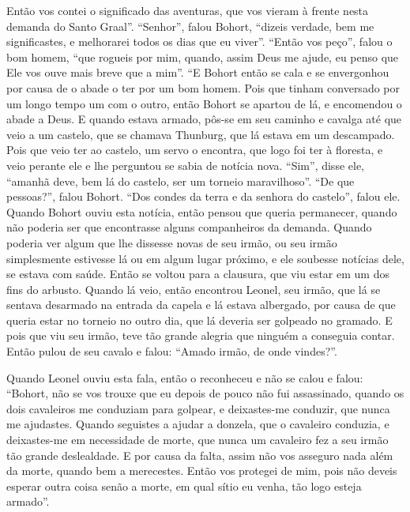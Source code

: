  Então vos contei o significado das aventuras, que vos vieram à frente nesta
demanda do Santo Graal”. “Senhor”, falou Bohort, “dizeis
verdade, bem me significastes, e melhorarei todos os dias que eu viver”. “Então
vos peço”, falou o bom homem, “que rogueis por mim, quando, assim Deus me
ajude, eu penso que Ele vos ouve mais breve que a mim”. “E Bohort então se cala
e se envergonhou por causa de o abade o ter por um bom homem. Pois que tinham
conversado por um longo tempo um com o outro, então Bohort se apartou de lá, e
encomendou o abade a Deus. E quando estava armado, pôs-se em seu caminho e
cavalga até que veio a um castelo, que se chamava Thunburg, que lá estava em um
descampado. Pois que veio ter ao castelo, um servo o encontra, que logo foi ter
à floresta, e veio perante ele e lhe perguntou se sabia de notícia nova. “Sim”,
disse ele, “amanhã deve, bem lá do castelo, ser um torneio maravilhoso”. “De
que pessoas?”, falou Bohort. “Dos condes da terra e da senhora do castelo”,
falou ele. Quando Bohort ouviu esta notícia, então pensou que queria
permanecer, quando não poderia ser que encontrasse alguns companheiros da
demanda. Quando poderia ver algum que lhe dissesse novas de seu irmão, ou seu
irmão simplesmente estivesse lá ou em algum lugar próximo, e ele soubesse
notícias dele, se estava com saúde. Então se voltou para a clausura, que viu
estar em um dos fins do arbusto. Quando lá veio, então encontrou Leonel, seu
irmão, que lá se sentava desarmado na entrada da capela e lá estava albergado,
por causa de que queria estar no torneio no outro dia, que lá deveria ser
golpeado no gramado. E pois que viu seu irmão, teve tão grande alegria que
ninguém a conseguia contar. Então pulou de seu cavalo e falou: “Amado irmão, de
onde vindes?”.

Quando Leonel ouviu esta fala, então o reconheceu e não se calou e falou:
“Bohort, não se vos trouxe que eu depois de pouco não fui assassinado, quando
os dois cavaleiros me conduziam para golpear, e deixastes-me conduzir, que
nunca me ajudastes. Quando seguistes a ajudar a donzela, que o cavaleiro
conduzia, e deixastes-me em necessidade de morte, que nunca um cavaleiro fez a
seu irmão tão grande deslealdade. E por causa da falta, assim não vos asseguro
nada além da morte, quando bem a merecestes. Então vos protegei de mim, pois
não deveis esperar outra coisa senão a morte, em qual sítio eu venha, tão logo
esteja armado”.

